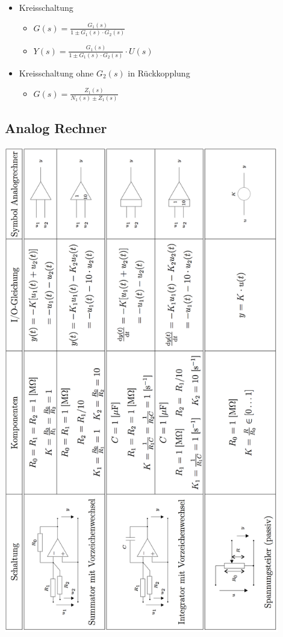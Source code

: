 \begin{multicols}{2}
\begin{itemize}
\item Kreisschaltung
\begin{itemize}
	\item $G(s) = \frac{G_1(s)}{1\pm G_1(s)\cdot G_2(s)}$
	\item $Y(s) = \frac{G_1(s)}{1\pm G_1(s)\cdot G_2(s)} \cdot U(s)$
\end{itemize}

\item Kreisschaltung ohne $G_2(s)$ in Rückkopplung
\begin{itemize}
	\item $G(s) = \frac{Z_1(s)}{N_1(s)\pm Z_1(s)}$
\end{itemize}

\end{itemize}
\end{multicols}

\subsection{Analog Rechner }
	\begin{center}
	\includegraphics[width=12cm]{./images/AnalogRechner}
	\end{center}


